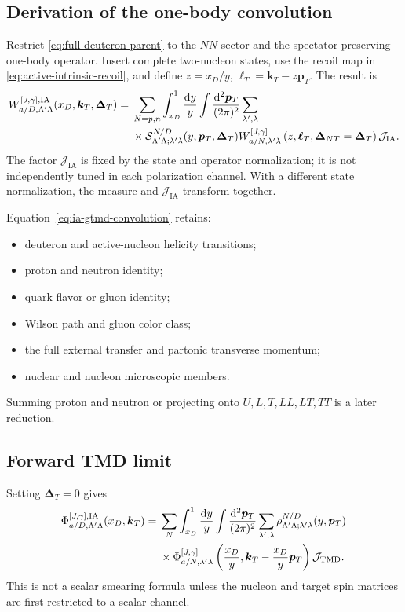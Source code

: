 \documentclass[11pt]{article}
\newcommand{\kT}{\bm{k}_{T}}
\newcommand{\ellT}{\bm{\ell}_{T}}
\newcommand{\pT}{\bm{p}_{T}}
\newcommand{\DT}{\bm{\Delta}_{T}}
\newcommand{\DNT}{\bm{\Delta}_{N T}}
\newcommand{\dd}{\mathrm{d}}
\newcommand{\TMD}{\mathrm{TMD}}
\newcommand{\cS}{\mathcal S}
\newcommand{\cJ}{\mathcal J}
\newcommand{\IA}{\mathrm{IA}}
\begin{document}
\subsection{Derivation of the one-body convolution}

Restrict \cref{eq:full-deuteron-parent} to the \(NN\) sector and the
spectator-preserving one-body operator.  Insert complete two-nucleon states,
use the recoil map in \cref{eq:active-intrinsic-recoil}, and define
\(z=x_D/y\), \(\ellT=\kT-z\pT\).  The result is
\begin{align}
 W_{a/D,\Lambda'\Lambda}^{[J,\gamma],\IA}
 (x_D,\kT,\DT)
 ={}&\sum_{N=p,n}
 \int_{x_D}^{1}\frac{\dd y}{y}
 \int\frac{\dd^2\pT}{(2\pi)^2}
 \sum_{\lambda',\lambda}
 \notag\\
 &\times
 \cS_{\Lambda'\Lambda;\lambda'\lambda}^{N/D}
 (y,\pT,\DT)
 W_{a/N,\lambda'\lambda}^{[J,\gamma]}
 \left(
 z,\ellT,\DNT=\DT
 \right)
 \cJ_{\IA}.
\label{eq:ia-gtmd-convolution}
\end{align}
The factor \(\cJ_{\IA}\) is fixed by the state and operator normalization;
it is not independently tuned in each polarization channel.  With a
different state normalization, the measure and \(\cJ_{\IA}\) transform
together.

Equation~\eqref{eq:ia-gtmd-convolution} retains:
\begin{itemize}
\item deuteron and active-nucleon helicity transitions;
\item proton and neutron identity;
\item quark flavor or gluon identity;
\item Wilson path and gluon color class;
\item the full external transfer and partonic transverse momentum;
\item nuclear and nucleon microscopic members.
\end{itemize}
Summing proton and neutron or projecting onto \(U,L,T,LL,LT,TT\) is a later
reduction.

\subsection{Forward TMD limit}

Setting \(\DT=0\) gives
\begin{align}
 \Phi_{a/D,\Lambda'\Lambda}^{[J,\gamma],\IA}
 (x_D,\kT)
 ={}&\sum_N
 \int_{x_D}^{1}\frac{\dd y}{y}
 \int\frac{\dd^2\pT}{(2\pi)^2}
 \sum_{\lambda',\lambda}
 \rho_{\Lambda'\Lambda;\lambda'\lambda}^{N/D}(y,\pT)
 \notag\\
 &\times
 \Phi_{a/N,\lambda'\lambda}^{[J,\gamma]}
 \left(\frac{x_D}{y},
 \kT-\frac{x_D}{y}\pT\right)
 \cJ_{\TMD}.
\label{eq:ia-tmd-convolution}
\end{align}
This is not a scalar smearing formula unless the nucleon and target spin
matrices are first restricted to a scalar channel.
\end{document}
